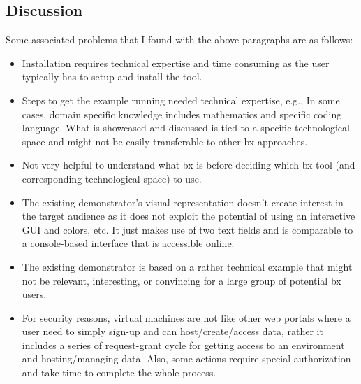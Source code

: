 \subsection{Discussion}\label{subsec:discussion}
Some associated problems that I found with the above paragraphs are as follows: 

\begin{itemize}
    \item {Installation requires technical expertise and time consuming as the user typically has to setup and install the tool.}

	\item {Steps to get the example running needed technical expertise, e.g., In some cases, domain specific knowledge includes mathematics and specific coding language. What is showcased and discussed is tied to a specific technological space and might not be easily transferable to other bx approaches.}
	
	\item {Not very helpful to understand what bx is before deciding which bx tool (and corresponding technological space) to use.}
	
	\item {The existing demonstrator's visual representation doesn't create interest in the target audience as it does not exploit the potential of using an interactive GUI and colors, etc. It just makes use of two text fields and is comparable to a console-based interface that is accessible online.}
	
	\item {The existing demonstrator is based on a rather technical example that might not be relevant, interesting, or convincing for a large group of potential bx users.}	
	
	\item {For security reasons, virtual machines are not like other web portals where a user need to simply sign-up and can host/create/access data, rather it includes a series of request-grant cycle for getting access to an environment and hosting/managing data. Also, some actions require special authorization and take time to complete the whole process.}

\end{itemize}
